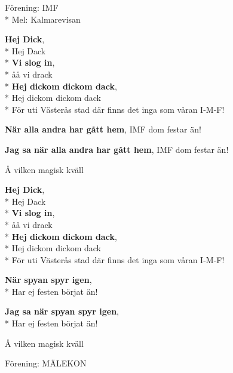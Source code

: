 \begin{SongText}
    \begin{SongInfo}
        Förening: IMF\\*%
        Mel: Kalmarevisan
    \end{SongInfo}
    \begin{SongVerse}
        \textbf{Hej Dick}, \\*%
        Hej Dack\\*%
        \textbf{Vi slog in}, \\*%
        åå vi drack\\*%
        \textbf{Hej dickom dickom dack}, \\*%
        Hej dickom dickom dack\\*%
        För uti Västerås stad där finns det inga som våran I-M-F!
    \end{SongVerse}
    \begin{SongVerse}
        \textbf{När alla andra har gått hem}, IMF dom festar än!

        \textbf{Jag sa när alla andra har gått hem}, IMF dom festar än!

        Å vilken magisk kväll
    \end{SongVerse}
    \begin{SongVerse}
        \textbf{Hej Dick}, \\*%
        Hej Dack\\*%
        \textbf{Vi slog in}, \\*%
        åå vi drack\\*%
        \textbf{Hej dickom dickom dack}, \\*%
        Hej dickom dickom dack\\*%
        För uti Västerås stad där finns det inga som våran I-M-F!
    \end{SongVerse}
    \begin{SongVerse}
        \textbf{När spyan spyr igen}, \\*%
        Har ej festen börjat än!

        \textbf{Jag sa när spyan spyr igen}, \\*%
        Har ej festen börjat än!

        Å vilken magisk kväll

    \end{SongVerse}
\end{SongText}

\begin{SongText}[???]
    \begin{SongInfo}
        Förening: MÄLEKON
    \end{SongInfo}
    \begin{SongVerse}
        [NO SONG]
    \end{SongVerse}
\end{SongText}


